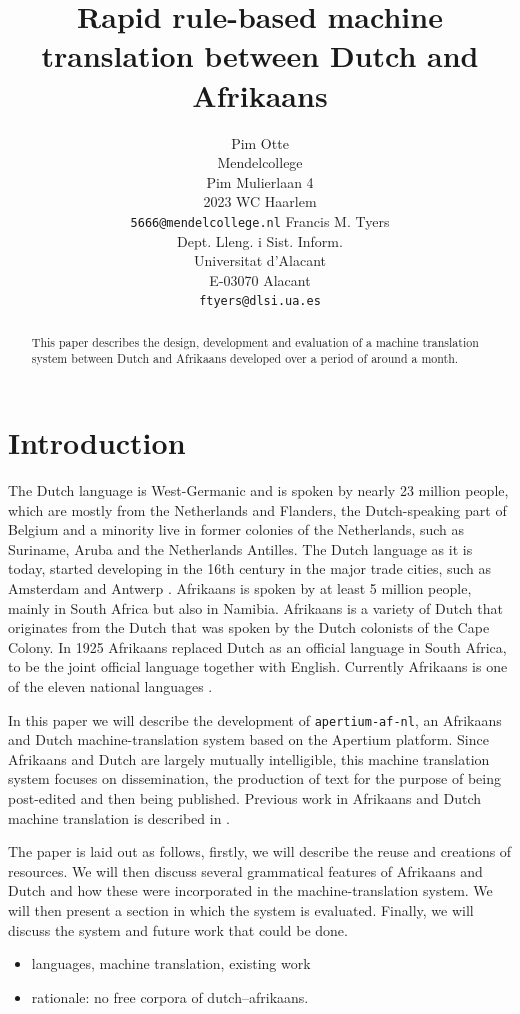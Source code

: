 \documentclass[11pt]{article}
\title{Rapid rule-based machine translation between Dutch and Afrikaans}
\author{Pim Otte\\
  Mendelcollege\\
  Pim Mulierlaan 4\\
  2023 WC Haarlem\\
  {\tt 5666@mendelcollege.nl}  \And
  Francis M. Tyers\\
  Dept. Lleng. i Sist. Inform.\\
  Universitat d'Alacant\\
  E-03070 Alacant \\
  {\tt ftyers@dlsi.ua.es}}
\date{}
\begin{document}
\maketitle
\begin{abstract}
 This paper describes the design, development and evaluation of a machine
 translation system between Dutch and Afrikaans developed over a period of
 around a month.
\end{abstract}

\section{Introduction}

The Dutch language is West-Germanic and is spoken by nearly 23 million people, which are 
mostly from the Netherlands and Flanders, the Dutch-speaking part of Belgium and a minority 
live in former colonies of the Netherlands, such as Suriname, Aruba and the Netherlands 
Antilles. The Dutch language as it is today, started developing in the 16th century in the 
major trade cities, such as Amsterdam and Antwerp \cite{Shetter:02}.  Afrikaans is spoken 
by at least 5 million people, mainly in South Africa but also in Namibia. Afrikaans is a 
variety of Dutch that originates from the Dutch that was spoken by the Dutch colonists of 
the Cape Colony. In 1925 Afrikaans replaced Dutch as an official language in South Africa, to 
be the joint official language together with English. Currently Afrikaans is one of the 
eleven national languages \cite{Donaldson:93}.

In this paper we will describe the development of {\small {\tt apertium-af-nl}}, an Afrikaans 
and Dutch machine-translation system based on the Apertium platform. Since Afrikaans and Dutch 
are largely mutually intelligible, this machine translation system focuses on dissemination, the 
production of text for the purpose of being post-edited and then being published. Previous 
work in Afrikaans and Dutch machine translation is described in \cite{Huyssteen:09}.

The paper is laid out as follows, firstly, we will describe the reuse and creations of 
resources. We will then discuss several grammatical features of Afrikaans and Dutch and how 
these were incorporated in the machine-translation system. We will then present a section 
in which the system is evaluated. Finally, we will discuss the system and future work that 
could be done.


\begin{itemize}
\item languages, machine translation, existing work
\item rationale: no free corpora of dutch--afrikaans.
\end{itemize}
\end{document}
